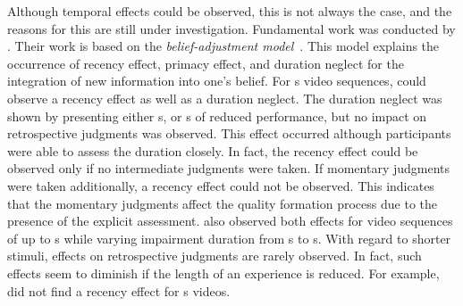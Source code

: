 Although temporal effects could be observed, this is not always the case, and the reasons for this are still under investigation.
Fundamental work was conducted by \citet{hands_recency_2001}.
Their work is based on the \emph{belief-adjustment model}~\citep{hogarth_order_1992}.
This model explains the occurrence of recency effect, primacy effect, and duration neglect for the integration of new information into one's belief. %
For \unit[30]{s} video sequences, \citet{hands_recency_2001} could observe a recency effect as well as a duration neglect.
The duration neglect was shown by presenting either \unit[5]{s}, or \unit[10]{s} of reduced performance, but no impact on retrospective judgments was observed.
This effect occurred although participants were able to assess the duration closely. %
In fact, the recency effect could be observed only if no intermediate judgments were taken.
If momentary judgments were taken additionally, a recency effect could not be observed.
This indicates that the momentary judgments affect the quality formation process due to the presence of the explicit assessment.
\citet{hamberg_time-varying_1999} also observed both effects for video sequences of up to \unit[180]{s} while varying impairment duration from \unit[2]{s} to \unit[10]{s}.
With regard to shorter stimuli, effects on retrospective judgments are rarely observed.
In fact, such effects seem to diminish if the length of an experience is reduced.
For example, \citet{ninassi_considering_2009} did not find a recency effect for \unit[8]{s} videos.

